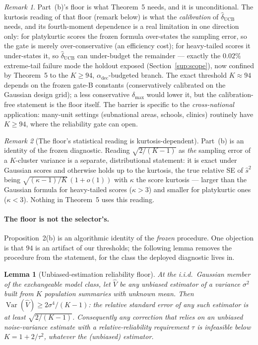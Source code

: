 \documentclass[12pt]{article}
\newtheorem{lemma}{Lemma}
\theoremstyle{definition}
\theoremstyle{remark}
\newtheorem{remark}{Remark}
\begin{document}
\begin{remark}
Part~(b)'s floor is what Theorem~5 needs, and it is unconditional. The
kurtosis reading of that floor (remark below) is what the \emph{calibration}
of $\widehat\delta_{\mathrm{UCB}}$ needs, and its
fourth-moment dependence is a real limitation in one direction only: for platykurtic
scores the frozen formula over-states the sampling error, so the gate is merely
over-conservative (an efficiency cost); for heavy-tailed scores it under-states it, so
$\widehat\delta_{\mathrm{UCB}}$ can under-budget the remainder --- exactly the
$0.02\%$ extreme-tail failure mode the holdout exposed (Section~\ref{sup:scope}), now confined by
Theorem~5 to the $K\ge94$, $\alpha_{\text{dec}}$-budgeted branch. The exact
threshold $K\approx94$ depends on the frozen gate-B constants (conservatively
calibrated on the Gaussian design grid); a less conservative $\delta_{\max}$ would lower
it, but the calibration-free statement is the floor itself. The barrier is specific to
the \emph{cross-national} application: many-unit settings (subnational areas, schools,
clinics) routinely have $K\ge94$, where the reliability gate can open.
\end{remark}

\begin{remark}[The floor's statistical reading is kurtosis-dependent]
Part~(b) is an identity of the frozen diagnostic. Reading $\sqrt{2/(K-1)}$ as
\emph{the} sampling error of a $K$-cluster variance is a separate,
distributional statement: it is exact under Gaussian scores and otherwise
holds up to the kurtosis, the true relative SE of $\widehat s^2$ being
$\sqrt{(\kappa-1)/K}\,(1+o(1))$ with $\kappa$ the score kurtosis --- larger
than the Gaussian formula for heavy-tailed scores ($\kappa>3$) and smaller
for platykurtic ones ($\kappa<3$). Nothing in Theorem~5 uses this reading.
\end{remark}

\paragraph{The floor is not the selector's.} Proposition~2(b) is an
algorithmic identity of the \emph{frozen} procedure. One objection is
that $94$ is an artifact of our thresholds; the following lemma removes the
procedure from the statement, for the class the deployed diagnostic lives in.

\begin{lemma}[Unbiased-estimation reliability floor]\label{lem:floor}
At the i.i.d.\ Gaussian member of the exchangeable model class, let
$\widehat V$ be any \emph{unbiased} estimator of a variance $\sigma^2$ built
from $K$ population summaries with unknown mean. Then
$\operatorname{Var}(\widehat V)\ge2\sigma^4/(K-1)$: the relative standard error
of any such estimator is at least $\sqrt{2/(K-1)}$. Consequently any
correction that relies on an unbiased noise-variance estimate with a
relative-reliability requirement $\tau$ is infeasible below $K=1+2/\tau^2$,
whatever the (unbiased) estimator.
\end{lemma}
\end{document}
